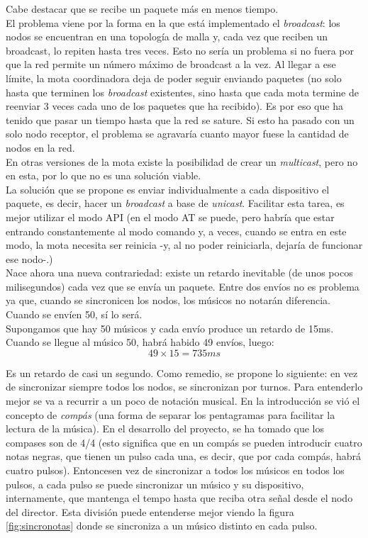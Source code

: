 Cabe destacar que se recibe un paquete más en menos tiempo.\\

El problema viene por la forma en la que está implementado el \textit{broadcast}:
los nodos se encuentran en una topología de malla y, cada vez que reciben un broadcast,
lo repiten hasta tres veces. Esto no sería un problema si no fuera por que la red
permite un número máximo de broadcast a la vez. Al llegar a ese límite, la mota
coordinadora deja de poder seguir enviando paquetes (no solo hasta que terminen los
\textit{broadcast} existentes, sino hasta que cada mota termine de reenviar 3 veces
cada uno de los paquetes que ha recibido). Es por eso que ha tenido que pasar un tiempo
hasta que la red se sature. Si esto ha pasado con un solo nodo receptor, el problema
se agravaría cuanto mayor fuese la cantidad de nodos en la red. \\

En otras versiones de la mota existe la posibilidad de crear un \textit{multicast},
pero no en esta, por lo que no es una solución viable.\\

La solución que se propone es enviar individualmente a cada dispositivo el paquete, es decir,
hacer un \textit{broadcast} a base de \textit{unicast}. Facilitar esta tarea, es mejor
utilizar el modo API (en el modo AT se puede, pero habría que estar entrando constantemente
al modo comando y, a veces, cuando se entra en este modo, la mota necesita ser reinicia -y,
al no poder reiniciarla, dejaría de funcionar ese nodo-.)\\

Nace ahora una nueva contrariedad: existe un retardo inevitable (de unos pocos milisegundos)
cada vez que se envía un paquete. Entre dos envíos no es problema ya que, cuando
se sincronicen los nodos, los músicos no notarán diferencia. Cuando se envíen 50, sí lo será.\\

Supongamos que hay 50 músicos y cada envío produce un retardo de 15ms. Cuando se llegue al músico
50, habrá habido 49 envíos, luego:
\[
  49 \times 15 = 735ms
\]

Es un retardo de casi un segundo. Como remedio, se propone lo siguiente: en vez de
sincronizar siempre todos los nodos, se sincronizan por turnos. Para entenderlo mejor se
va a recurrir a un poco de notación musical. En la introducción se vió el concepto de \textit{compás}
(una forma de separar los pentagramas para facilitar la lectura de la música). En el desarrollo
del proyecto, se ha tomado que los compases son de 4/4 (esto significa que en un compás se pueden introducir
cuatro notas negras, que tienen un pulso cada una, es decir, que por cada compás,
habrá cuatro pulsos). Entoncesen vez de sincronizar a todos los músicos en todos los pulsos,
a cada pulso se puede sincronizar un músico y su dispositivo, internamente, que mantenga el tempo hasta
que reciba otra señal desde el nodo del director. Esta división puede entenderse mejor viendo
la figura \ref{fig:sincronotas} donde se sincroniza a un músico distinto en cada pulso.

